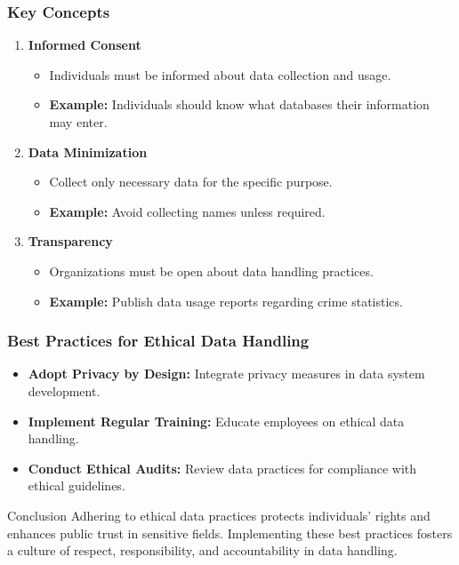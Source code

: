 \documentclass[aspectratio=169]{beamer}
\begin{document}
\begin{frame}[fragile]
    \frametitle{Key Concepts}
    \begin{enumerate}
        \item \textbf{Informed Consent}
        \begin{itemize}
            \item Individuals must be informed about data collection and usage.
            \item \textbf{Example:} Individuals should know what databases their information may enter.
        \end{itemize}
        
        \item \textbf{Data Minimization}
        \begin{itemize}
            \item Collect only necessary data for the specific purpose.
            \item \textbf{Example:} Avoid collecting names unless required.
        \end{itemize}
        
        \item \textbf{Transparency}
        \begin{itemize}
            \item Organizations must be open about data handling practices.
            \item \textbf{Example:} Publish data usage reports regarding crime statistics.
        \end{itemize}
    \end{enumerate}
\end{frame}

\begin{frame}[fragile]
    \frametitle{Best Practices for Ethical Data Handling}
    \begin{itemize}
        \item \textbf{Adopt Privacy by Design:} Integrate privacy measures in data system development.
        \item \textbf{Implement Regular Training:} Educate employees on ethical data handling.
        \item \textbf{Conduct Ethical Audits:} Review data practices for compliance with ethical guidelines.
    \end{itemize}
    \begin{block}{Conclusion}
        Adhering to ethical data practices protects individuals' rights and enhances public trust in sensitive fields. Implementing these best practices fosters a culture of respect, responsibility, and accountability in data handling.
    \end{block}
\end{frame}
\end{document}
